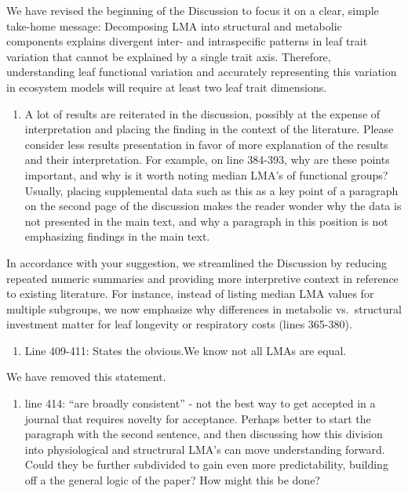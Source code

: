 \documentclass[
  12pt,
  letterpaper,
  DIV=11,
  numbers=noendperiod]{scrartcl}
\providecommand{\tightlist}{%
  \setlength{\itemsep}{0pt}\setlength{\parskip}{0pt}}\usepackage{longtable,booktabs,array}
\renewenvironment{quote}
  {\begin{customblockquote}\color{blockquote-text}\ignorespaces}
  {\end{customblockquote}}
\begin{document}
We have revised the beginning of the Discussion to focus it on a clear,
simple take-home message: Decomposing LMA into structural and metabolic
components explains divergent inter- and intraspecific patterns in leaf
trait variation that cannot be explained by a single trait axis.
Therefore, understanding leaf functional variation and accurately
representing this variation in ecosystem models will require at least
two leaf trait dimensions.

\begin{quote}
\begin{enumerate}
\def\labelenumi{\arabic{enumi})}
\setcounter{enumi}{1}
\tightlist
\item
  A lot of results are reiterated in the discussion, possibly at the
  expense of interpretation and placing the finding in the context of
  the literature. Please consider less results presentation in favor of
  more explanation of the results and their interpretation. For example,
  on line 384-393, why are these points important, and why is it worth
  noting median LMA's of functional groups? Usually, placing
  supplemental data such as this as a key point of a paragraph on the
  second page of the discussion makes the reader wonder why the data is
  not presented in the main text, and why a paragraph in this position
  is not emphasizing findings in the main text.
\end{enumerate}
\end{quote}

In accordance with your suggestion, we streamlined the Discussion by
reducing repeated numeric summaries and providing more interpretive
context in reference to existing literature. For instance, instead of
listing median LMA values for multiple subgroups, we now emphasize why
differences in metabolic vs.~structural investment matter for leaf
longevity or respiratory costs (lines 365-380).

\begin{quote}
\begin{enumerate}
\def\labelenumi{\arabic{enumi})}
\setcounter{enumi}{2}
\tightlist
\item
  Line 409-411: States the obvious.We know not all LMAs are equal.
\end{enumerate}
\end{quote}

We have removed this statement.

\begin{quote}
\begin{enumerate}
\def\labelenumi{\arabic{enumi})}
\setcounter{enumi}{3}
\tightlist
\item
  line 414: ``are broadly consistent'' - not the best way to get
  accepted in a journal that requires novelty for acceptance. Perhaps
  better to start the paragraph with the second sentence, and then
  discussing how this division into physiological and structrural LMA's
  can move understanding forward. Could they be further subdivided to
  gain even more predictability, building off a the general logic of the
  paper? How might this be done?
\end{enumerate}
\end{quote}
\end{document}

